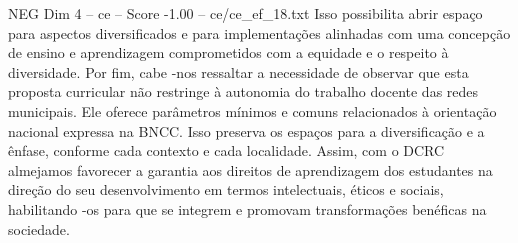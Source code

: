 \begin{textsample}{NEG Dim 4 – ce – Score -1.00 – ce/ce\_ef\_18.txt}
Isso possibilita abrir espaço para aspectos diversificados e para implementações alinhadas com uma concepção de ensino e aprendizagem comprometidos com a equidade e o respeito à diversidade.
Por fim, cabe -nos ressaltar a necessidade de observar que esta proposta curricular não restringe à autonomia do trabalho docente das redes municipais.
Ele oferece parâmetros mínimos e comuns relacionados à orientação nacional expressa na BNCC.
Isso preserva os espaços para a diversificação e a ênfase, conforme cada contexto e cada localidade.
Assim, com o DCRC almejamos favorecer a garantia aos direitos de aprendizagem dos estudantes na direção do seu desenvolvimento em termos intelectuais, éticos e sociais, habilitando -os para que se integrem e promovam transformações benéficas na sociedade.

\end{textsample}

